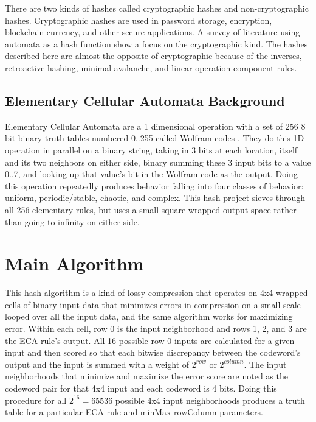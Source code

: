 \documentclass[11pt]{article}
\begin{document}
There are two kinds of hashes called cryptographic hashes and non-cryptographic hashes. Cryptographic hashes are used in password storage, encryption, blockchain currency, and other secure applications. A survey of literature using automata as a hash function show a focus on the cryptographic kind. \cite{app14219719} \cite{article} \cite{Rajeshwaran2019CellularAB} The hashes described here are almost the opposite of cryptographic because of the inverses, retroactive hashing, minimal avalanche, and linear operation component rules.\\

\subsection{Elementary Cellular Automata Background}

Elementary Cellular Automata are a 1 dimensional operation with a set of 256 8 bit binary truth tables numbered 0..255 called Wolfram codes \cite{Wolfram}. They do this 1D operation in parallel on a binary string, taking in 3 bits at each location, itself and its two neighbors on either side, binary summing these 3 input bits to a value 0..7, and looking up that value's bit in the Wolfram code as the output. Doing this operation repeatedly produces behavior falling into four classes of behavior: uniform, periodic/stable, chaotic, and complex. This hash project sieves through all 256 elementary rules, but uses a small square wrapped output space rather than going to infinity on either side.

\section{Main Algorithm}
This hash algorithm is a kind of lossy compression that operates on 4x4 wrapped cells of binary input data that minimizes errors in compression on a small scale looped over all the input data, and the same algorithm works for maximizing error. Within each cell, row 0 is the input neighborhood and rows 1, 2, and 3 are the ECA rule's output. All 16 possible row 0 inputs are calculated for a given input and then scored so that each bitwise discrepancy between the codeword's output and the input is summed with a weight of $2^{row}$ or $2^{column}$. The input neighborhoods that minimize and maximize the error score are noted as the codeword pair for that 4x4 input and each codeword is 4 bits. Doing this procedure for all  $2^{16}=65536$ possible 4x4 input neighborhoods produces a truth table for a particular ECA rule and minMax rowColumn parameters.\\
\end{document}
